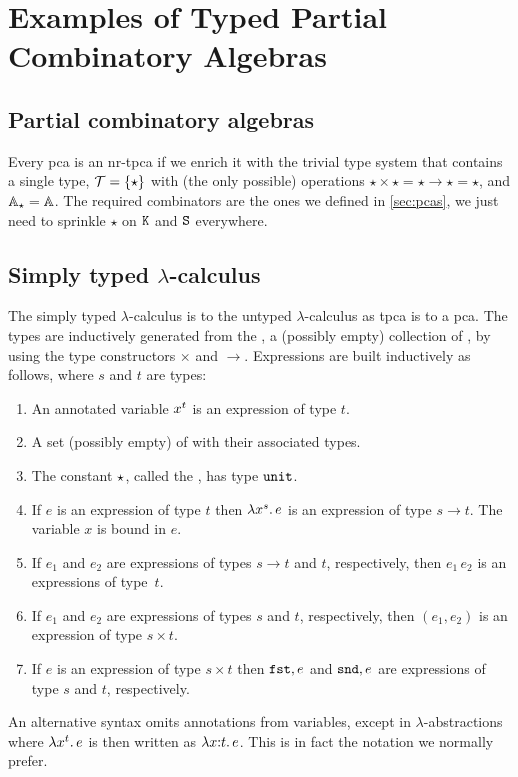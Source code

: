 \section{Examples of Typed Partial Combinatory Algebras}
\label{sec:examples-tpcas}

\subsection{Partial combinatory algebras}

Every pca is an nr-tpca if we enrich it with the trivial type system
that contains a single type, $\mathcal{T} = \set{\star}$ with (the
only possible) operations $\star \times \star = \star \to \star =
\star$, and $\AA_\star = \AA$. The required combinators are the ones we
defined in \cref{sec:pcas}, we just need to sprinkle $\star$ on
$\combK$ and $\combS$ everywhere.


\subsection[\texorpdfstring%
{Simply typed $\lambda$-calculus}%
{Simply typed lambda-calculus}%
]{Simply typed $\lambda$-calculus}
\label{sec:typed-lambda-calculus}

The simply typed $\lambda$-calculus is to the untyped $\lambda$-calculus as
tpca is to a pca. The types are inductively generated from the
, a (possibly empty) collection of
, by using the type constructors $\times$ and
$\to$. Expressions are built inductively as follows, where $s$ and $t$
are types:
%
\begin{enumerate}
\item An annotated variable $\annot{x}{t}$ is an expression of type
  $t$.
\item A set (possibly empty) of  with their associated types.
\item The constant $\ttunit$, called the , has type
  $\unit$.
\item If $e$ is an expression of type $t$ then
  $\lam{\annot{x}{s}}{e}$ is an expression of type $s \to t$. The
  variable $x$ is bound in $e$.
\item If $e_1$ and $e_2$ are expressions of types $s \to t$ and
  $t$, respectively, then $e_1\, e_2$ is an expressions of type~$t$.
\item If $e_1$ and $e_2$ are expressions of types $s$ and $t$,
  respectively, then $(e_1, e_2)$ is an expression of type $s \times
  t$.
\item If $e$ is an expression of type $s \times t$ then $\fst{e}$ and
  $\snd{e}$ are expressions of type $s$ and $t$, respectively.
\end{enumerate}
%
An alternative syntax omits annotations from variables, except in
$\lambda$-abstractions where $\lam{\annot{x}{t}}{e}$ is then written
as $\lam{x \of t}{e}$. This is in fact the notation we normally prefer.

